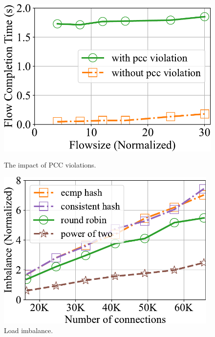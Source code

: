 \begin{figure}[htbp]
	\setlength{\abovecaptionskip}{0pt}
	\setlength{\belowcaptionskip}{-10pt}
	\begin{minipage}[t]{0.33\linewidth}
		\centering
		\includegraphics[width=1\textwidth]{experiment/0pccviolation.pdf}
		\caption{The impact of PCC violations.}
		\label{100}
	\end{minipage}%
	\centering
	\begin{minipage}[t]{0.33\linewidth}
		\centering
		\includegraphics[width=0.977\textwidth]{experiment/1balancescheme.pdf}
		\caption{Load imbalance.}
		\label{2}
	\end{minipage}%
	\begin{minipage}[t]{0.33\linewidth}
		\centering

\end{minipage}
\end{figure}
